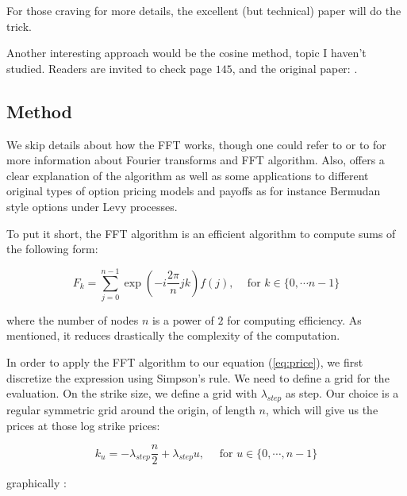 For those craving for more details, the excellent (but technical) paper \cite{optimal_fourier_inversion} will do the trick.

Another interesting approach would be the cosine method, topic I haven't studied. Readers are invited to check \cite{num_methods} page $145$, and the original paper: \cite{fang}.


\subsection{Method}
\label{method-fft}

We skip details about how the FFT works, though one could refer to \cite{annalisa} or to \cite{num_methods} for more information about Fourier transforms and FFT algorithm. Also, \cite{fft_improve} offers a clear explanation of the algorithm as well as some applications to different original types of option pricing models and payoffs as for instance Bermudan style options under Levy processes.



To put it short, the FFT algorithm is an efficient algorithm to compute sums of the following form: 

\begin{equation}
\label{eq:FFT_form}
F_k = \sum_{j=0}^{n-1} \exp \left ( - i \frac{ 2 \pi }{ n } j k \right ) f(j) \text{,} \quad \text{ for } k \in \{ 0, \cdots n-1 \} 
\end{equation}

where the number of nodes $n$ is a power of $2$ for computing efficiency. As mentioned, it reduces drastically the complexity of the computation.

In order to apply the FFT algorithm to our equation (\ref{eq:price}), we first discretize the expression using Simpson's rule. We need to define a grid for the evaluation. On the strike size, we define a grid with $\lambda_{step}$ as step. Our choice is a regular symmetric grid around the origin, of length $n$, which will give us the prices at those log strike prices:

$$ k_u =  - \lambda_{step} \frac { n } 2 + \lambda_{step} u, \quad \text{ for } u \in \{ 0, \cdots, n-1 \} $$

graphically :


\begin{figure}[h]
\centering
{}
\end{figure}


